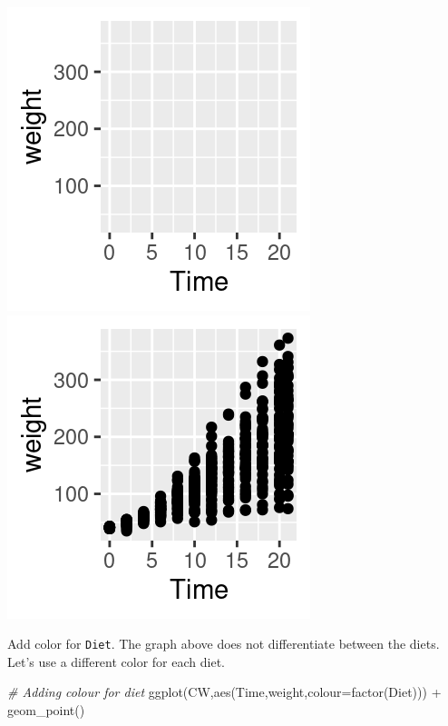 \documentclass[
  14pt,
]{memoir}
\newenvironment{Shaded}{\begin{snugshade}}{\end{snugshade}}
\newcommand{\AttributeTok}[1]{\textcolor[rgb]{0.77,0.63,0.00}{#1}}
\newcommand{\CommentTok}[1]{\textcolor[rgb]{0.56,0.35,0.01}{\textit{#1}}}
\newcommand{\FunctionTok}[1]{\textcolor[rgb]{0.00,0.00,0.00}{#1}}
\newcommand{\NormalTok}[1]{#1}
\newcommand{\SpecialCharTok}[1]{\textcolor[rgb]{0.00,0.00,0.00}{#1}}
\begin{document}
\begin{center}\includegraphics[width=0.8\linewidth]{figure/minimal-emptyPlot-1} \includegraphics[width=0.8\linewidth]{figure/minimal-emptyPlot-2} \end{center}

Add color for \texttt{Diet}. The graph above does not differentiate between the diets. Let's use a different color for
each diet.

\begin{Shaded}
\begin{Highlighting}[]
\CommentTok{\# Adding colour for diet}
\FunctionTok{ggplot}\NormalTok{(CW,}\FunctionTok{aes}\NormalTok{(Time,weight,}\AttributeTok{colour=}\FunctionTok{factor}\NormalTok{(Diet))) }\SpecialCharTok{+}
  \FunctionTok{geom\_point}\NormalTok{() }
\end{Highlighting}
\end{Shaded}
\end{document}
